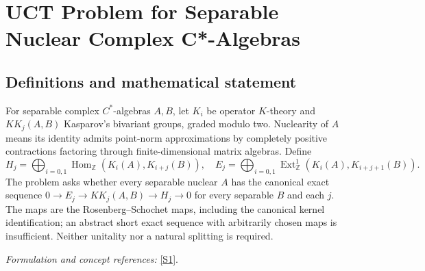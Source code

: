 \documentclass[11pt,a4paper]{article}
\newcommand{\Z}{\mathbb{Z}}
\newcommand{\sref}[2]{\hyperlink{source:#1:#2}{[S#2]}}
\newif\ifshowcatalogue
\newcommand{\cataloguescope}[1]{\ifshowcatalogue
 \paragraph{Exact scope in the supplied catalogue.}
 \begin{quote}\small #1\end{quote}\fi}
\begin{document}
\setcounter{section}{0}
\clearpage
\section*{\texorpdfstring{UCT Problem for Separable Nuclear Complex C*-Algebras}{UCT Problem for Separable Nuclear Complex C*-Algebras}}\label{30006980}
\subsection{Definitions and mathematical statement}
For separable complex $C^*$-algebras $A,B$, let $K_i$ be operator $K$-theory and $KK_j(A,B)$ Kasparov's bivariant groups, graded modulo two. Nuclearity of $A$ means its identity admits point-norm approximations by completely positive contractions factoring through finite-dimensional matrix algebras. Define
\[
 H_j=\bigoplus_{i=0,1}\operatorname{Hom}_{\Z}(K_i(A),K_{i+j}(B)),\quad
 E_j=\bigoplus_{i=0,1}\operatorname{Ext}^1_{\Z}(K_i(A),K_{i+j+1}(B)).
\]
The problem asks whether every separable nuclear $A$ has the canonical exact sequence
$0\to E_j\to KK_j(A,B)\to H_j\to0$ for every separable $B$ and each $j$. The maps are the Rosenberg--Schochet maps, including the canonical kernel identification; an abstract short exact sequence with arbitrarily chosen maps is insufficient. Neither unitality nor a natural splitting is required.
\par\smallskip\textit{Formulation and concept references:} \sref{30006980}{1}.
\cataloguescope{Decide whether EVERY separable nuclear complex C*-algebra A, unital or nonunital, satisfies the Rosenberg-Schochet UCT: for EVERY separable complex C*-algebra B, unital or nonunital, and each j in Z/2, the canonical UCT sequence 0 -> E\_j(A,B) -> KK\_j(A,B) -> H\_j(A,B) -> 0 is exact. Here H\_j(A,B)=direct\_sum\_(i=0,1) Hom\_Z(K\_i(A),K\_(i+j)(B)) and E\_j(A,B)=direct\_sum\_(i=0,1) Ext\_Z\textasciicircum{}1(K\_i(A),K\_(i+j+1)(B)), with indices modulo2. The right map is the natural map on K-theory induced by KK classes; the left is the canonical inverse extension-class identification of the kernel, not an arbitrary chosen injection. No canonical or natural splitting is required. Equivalently, every such A belongs to the Rosenberg-Schochet bootstrap category of separable nuclear C*-algebras, or is KK-equivalent to a separable commutative complex C*-algebra.}
\end{document}
